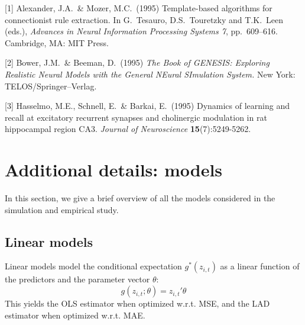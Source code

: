 \documentclass{article}
\begin{document}
\small

[1] Alexander, J.A.\ \& Mozer, M.C.\ (1995) Template-based algorithms for
connectionist rule extraction. In G.\ Tesauro, D.S.\ Touretzky and T.K.\ Leen
(eds.), {\it Advances in Neural Information Processing Systems 7},
pp.\ 609--616. Cambridge, MA: MIT Press.

[2] Bower, J.M.\ \& Beeman, D.\ (1995) {\it The Book of GENESIS: Exploring
  Realistic Neural Models with the General NEural SImulation System.}  New York:
TELOS/Springer--Verlag.

[3] Hasselmo, M.E., Schnell, E.\ \& Barkai, E.\ (1995) Dynamics of learning and
recall at excitatory recurrent synapses and cholinergic modulation in rat
hippocampal region CA3. {\it Journal of Neuroscience} {\bf 15}(7):5249-5262.


\appendix

\newpage

\section{Additional details: models}
In this section, we give a brief overview of all the models considered in the simulation and empirical study.

\subsection{Linear models}
Linear models model the conditional expectation \( g^*(z_{i, t}) \) as a linear function of the predictors and the parameter vector \( \theta \):
\begin{equation}
g(z_{i, t};\theta) = z_{i, t}' \theta
\end{equation}
This yields the OLS estimator when optimized w.r.t. MSE, and the LAD estimator when optimized w.r.t. MAE.
\end{document}
